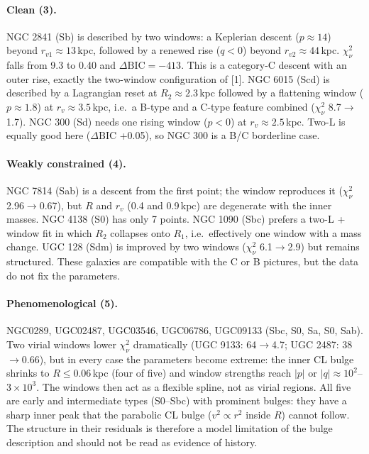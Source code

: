 \documentclass[10pt]{article}
\begin{document}
\paragraph{Clean (3).} NGC 2841 (Sb) is described by two windows: a Keplerian descent ($p\approx14$) beyond $r_{v1}\approx13$\,kpc, followed by a renewed rise ($q<0$) beyond $r_{v2}\approx44$\,kpc. $\chi^2_\nu$ falls from 9.3 to 0.40 and $\Delta\mathrm{BIC}=-413$. This is a category-C descent with an outer rise, exactly the two-window configuration of [1]. NGC 6015 (Scd) is described by a Lagrangian reset at $R_2\approx2.3$\,kpc followed by a flattening window ($p\approx1.8$) at $r_v\approx3.5$\,kpc, i.e.\ a B-type and a C-type feature combined ($\chi^2_\nu$ 8.7$\to$1.7). NGC 300 (Sd) needs one rising window ($p<0$) at $r_v\approx2.5$\,kpc. Two-L is equally good here ($\Delta\mathrm{BIC}$ +0.05), so NGC 300 is a B/C borderline case.

\paragraph{Weakly constrained (4).} NGC 7814 (Sab) is a descent from the first point; the window reproduces it ($\chi^2_\nu$ 2.96$\to$0.67), but $R$ and $r_v$ (0.4 and 0.9\,kpc) are degenerate with the inner masses. NGC 4138 (S0) has only 7 points. NGC 1090 (Sbc) prefers a two-L + window fit in which $R_2$ collapses onto $R_1$, i.e.\ effectively one window with a mass change. UGC 128 (Sdm) is improved by two windows ($\chi^2_\nu$ 6.1$\to$2.9) but remains structured. These galaxies are compatible with the C or B pictures, but the data do not fix the parameters.

\paragraph{Phenomenological (5).} NGC0289, UGC02487, UGC03546, UGC06786, UGC09133 (Sbc, S0, Sa, S0, Sab). Two virial windows lower $\chi^2_\nu$ dramatically (UGC 9133: 64$\to$4.7; UGC 2487: 38$\to$0.66), but in every case the parameters become extreme: the inner CL bulge shrinks to $R\le0.06$\,kpc (four of five) and window strengths reach $|p|$ or $|q|\approx10^2$--$3\times10^3$. The windows then act as a flexible spline, not as virial regions. All five are early and intermediate types (S0--Sbc) with prominent bulges: they have a sharp inner peak that the parabolic CL bulge ($v^2\propto r^2$ inside $R$) cannot follow. The structure in their residuals is therefore a model limitation of the bulge description and should not be read as evidence of history.
\end{document}
